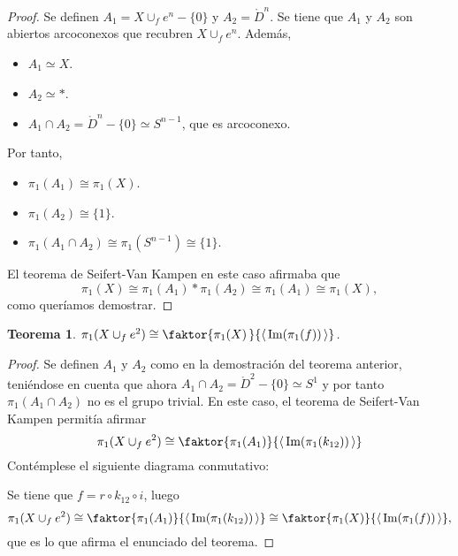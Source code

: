 \documentclass[11pt]{report}
\newenvironment{ctheorem} %
  {\begin{mdframed}[innertopmargin = 0pt,
                    innerbottommargin = 7.5pt,
                    backgroundcolor = lightgray!10,
                    linewidth = 1pt,
                    shadow = true,
                    shadowsize = 5pt,
                    roundcorner = 0pt,
                    skipabove = 0pt]
    \begin{theorem}}
  {\end{theorem}\end{mdframed}}
\newtheorem{theorem}{Teorema}[chapter]
\theoremstyle{definition}
\theoremstyle{definition}
\theoremstyle{remark}
\begin{document}
\begin{proof}
Se definen $A_1 = X \cup_f e^n - \{0\}$ y $A_2 = \mathring{D}^n$. Se tiene que $A_1$ y $A_2$ son abiertos arcoconexos que recubren $X \cup_f e^n$. Además,
\begin{itemize}
    \item $A_1 \simeq X$.
    \item $A_2 \simeq \ast$.
    \item $A_1 \cap A_2 = \mathring{D}^n - \{0\} \simeq S^{n-1}$, que es arcoconexo.
\end{itemize}
Por tanto,
\begin{itemize}
    \item $\pi_1(A_1) \cong \pi_1(X)$.
    \item $\pi_1(A_2) \cong \{1\}$.
    \item $\pi_1(A_1 \cap A_2) \cong \pi_1(S^{n-1}) \cong \{1\}$.
\end{itemize}
El teorema de Seifert-Van Kampen en este caso afirmaba que
\[\pi_1(X) \cong \pi_1(A_1) \ast \pi_1(A_2) \cong \pi_1(A_1) \cong \pi_1(X),\]
como queríamos demostrar.
\end{proof}

\begin{ctheorem}
$\pi_1(X \cup_f  e^2) \cong \faktor{\pi_1(X) \, }{\langle \, \textup{Im}(\pi_1(f))\, \rangle}$.
\end{ctheorem}

\begin{proof}
Se definen $A_1$ y $A_2$ como en la demostración del teorema anterior, teniéndose en cuenta que ahora $A_1 \cap A_2 = \mathring{D}^2 - \{0\} \simeq S^1$ y por tanto $\pi_1(A_1 \cap A_2)$ no es el grupo trivial. En este caso, el teorema de Seifert-Van Kampen permitía afirmar
\[\pi_1(X \cup_f e^2) \cong \faktor{\pi_1(A_1)}{\langle\, \textup{Im} (\pi_1(k_{12})) \,\rangle}\]
Contémplese el siguiente diagrama conmutativo:
\begin{center}
\end{center}
Se tiene que $f = r \circ k_{12} \circ i$, luego
\[\pi_1(X \cup_f e^2) \cong \faktor{\pi_1(A_1)}{\langle \,\textup{Im} (\pi_1(k_{12})) \,\rangle} \cong \faktor{\pi_1(X)}{\langle \,\textup{Im}(\pi_1(f)) \,\rangle},\]
que es lo que afirma el enunciado del teorema.
\end{proof}
\end{document}

